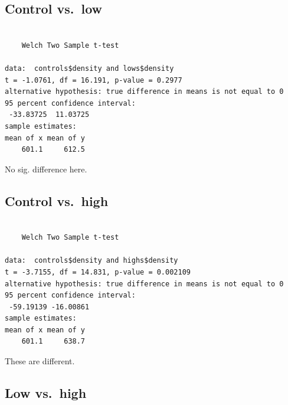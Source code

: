 \documentclass[
  letterpaper,
  DIV=11,
  numbers=noendperiod]{scrartcl}
\newenvironment{Shaded}{\begin{snugshade}}{\end{snugshade}}
\newcommand{\FunctionTok}[1]{\textcolor[rgb]{0.28,0.35,0.67}{#1}}
\newcommand{\NormalTok}[1]{\textcolor[rgb]{0.00,0.23,0.31}{#1}}
\newcommand{\SpecialCharTok}[1]{\textcolor[rgb]{0.37,0.37,0.37}{#1}}
\begin{document}
\hypertarget{control-vs.-low}{%
\subsection{Control vs.~low}\label{control-vs.-low}}

\begin{Shaded}
\end{Shaded}

\begin{verbatim}

    Welch Two Sample t-test

data:  controls$density and lows$density
t = -1.0761, df = 16.191, p-value = 0.2977
alternative hypothesis: true difference in means is not equal to 0
95 percent confidence interval:
 -33.83725  11.03725
sample estimates:
mean of x mean of y 
    601.1     612.5 
\end{verbatim}

No sig. difference here.

\hypertarget{control-vs.-high}{%
\subsection{Control vs.~high}\label{control-vs.-high}}

\begin{Shaded}
\end{Shaded}

\begin{verbatim}

    Welch Two Sample t-test

data:  controls$density and highs$density
t = -3.7155, df = 14.831, p-value = 0.002109
alternative hypothesis: true difference in means is not equal to 0
95 percent confidence interval:
 -59.19139 -16.00861
sample estimates:
mean of x mean of y 
    601.1     638.7 
\end{verbatim}

These are different.

\hypertarget{low-vs.-high}{%
\subsection{Low vs.~high}\label{low-vs.-high}}
\end{document}
